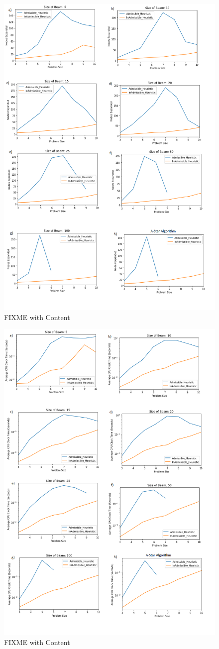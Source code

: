 \documentclass{article}
\begin{document}
\begin{figure}[h!]
\centering
\includegraphics[width=0.7\linewidth]{all_nodes_expanded.png}
\caption{FIXME with Content}
\label{fig:reflex}
\end{figure}


\begin{figure}[h!]
\centering
\includegraphics[width=0.7\linewidth]{cpu_time_all.png}
\caption{FIXME with Content}
\label{fig:reflex}
\end{figure}
\end{document}
